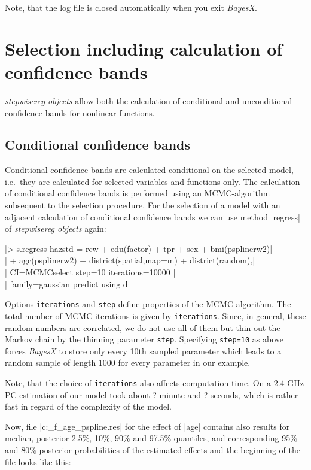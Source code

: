 Note, that the log file is closed automatically when you exit {\it BayesX}.


\section{Selection including calculation of confidence bands}\label{step:confidence}

{\it stepwisereg objects} allow both the calculation of conditional and unconditional confidence bands for nonlinear functions.

\subsection{Conditional confidence bands}\label{step:cond}

Conditional confidence bands are calculated conditional on the selected model, i.e.~they are calculated for selected variables
and functions only. The calculation of conditional confidence bands is performed using an MCMC-algorithm subsequent to the
selection procedure. For the selection of a model with an adjacent calculation of conditional confidence bands we can use
method |regress| of {\it stepwisereg objects} again:

 |> s.regress hazstd = rcw + edu(factor) + tpr + sex + bmi(psplinerw2)|\\
 |  + agc(psplinerw2) + district(spatial,map=m) + district(random),|\\
 |  CI=MCMCselect step=10 iterations=10000 |\\
 |  family=gaussian predict using d|

Options {\tt iterations} and {\tt step} define properties of the MCMC-algorithm. The total number of MCMC iterations is given
by {\tt iterations}. Since, in general, these random numbers are correlated, we do not use all of them but thin out the Markov
chain by the thinning parameter {\tt step}. Specifying {\tt step=10} as above forces {\it BayesX} to store only every 10th
sampled parameter which leads to a random sample of length 1000 for every parameter in our example.

Note, that the choice of {\tt iterations} also affects computation time. On a 2.4 GHz PC estimation of our model took about ?
minute and ? seconds, which is rather fast in regard of the complexity of the model.

Now, file |c:\data\s_f_age_pspline.res| for the effect of |age| contains also results for median, posterior 2.5\%, 10\%, 90\%
and 97.5\% quantiles, and corresponding 95\% and 80\% posterior probabilities of the estimated effects and the beginning of the
file looks like this:

